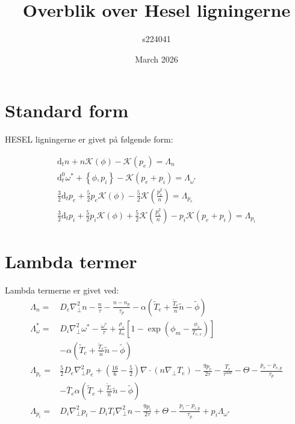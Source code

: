 \documentclass{article}
\title{Overblik over Hesel ligningerne}
\author{s224041}
\date{March 2026}
\begin{document}
\maketitle
\newpage

\section{Standard form}

HESEL ligningerne er givet på følgende form:

\begin{gather*}
    \mathrm{d} _t n + n\mathcal{K}(\phi) - \mathcal{K}(p_e) = \Lambda_n  \label{tæthedsligning} \\ 
    \mathrm{d}_t^0 \omega^* + \left\{\phi, p_i \right\} - \mathcal{K}(p_e+p_i)=\Lambda_{\omega^*} \label{vorticiteten} \\
    \frac{3}{2}\mathrm{d} _t p_e + \frac{5}{2}p_e \mathcal{K}(\phi) -\frac{5}{2}\mathcal{K}\left(\frac{p_e^2}{n}\right)= \Lambda_{p_e}\label{elektrontryksligning} \\
    \frac{3}{2}\mathrm{d} _t p_i + \frac{5}{2}p_i \mathcal{K}(\phi) +\frac{5}{2}\mathcal{K}\left(\frac{p_i^2}{n}\right) - p_i\mathcal{K}(p_e+p_i) = \Lambda_{p_i} \label{iontryksligning}
\end{gather*}


\section{Lambda termer}
Lambda termerne er givet ved:
\begin{align*}
\Lambda_n =& D_e\nabla_\perp^2 n -\frac{n}{\tau} -\frac{n-n_p}{\tau_p}-\alpha\left(\tilde T_e+ \frac{\tilde T_e}{\bar n}\tilde n-\tilde\phi\right)\\ 
\Lambda_\omega^{*}=& D_i\nabla_\perp^2\omega^{*}-\frac{\omega^{*}}{\tau}+\frac{\rho_s}{L_c}\left[1-\exp\left(\phi_m-\frac{\phi_s}{T_{e,s}}\right)\right] \\
                   &-\alpha\left( \tilde T_e+ \frac{\tilde T_e}{\bar n}\tilde n -\tilde\phi \right)\\
\Lambda_{p_e} =& \frac{5}{2}D_e\nabla_\perp^2 p_e  + \left(\frac{16}{6} - \frac{5}{2}\right)\nabla\cdot\left(n\nabla_\perp T_e\right) - \frac{9p_e}{2\tau} - \frac{T_e}{\tau^{SH}}-\Theta -\frac{p_e-p_{e,p}}{\tau_p} \\
               &-\bar T_e \alpha\left( \tilde T_e + \frac{\tilde T_e}{\bar n}\tilde n -\tilde\phi \right)\\
\Lambda_{p_i} =& D_i\nabla_\perp^2 p_i - D_iT_i\nabla_\perp^2n - \frac{9p_i}{2\tau} +\Theta -\frac{p_i-p_{i,p}}{\tau_p} +p_i\Lambda_{\omega^*}
\end{align*}
\end{document}
